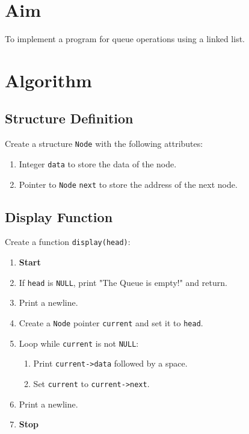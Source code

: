 
\section{Aim}
To implement a program for queue operations using a linked list.

\section{Algorithm}
 {\selectfont

  \subsection{Structure Definition}
  Create a structure \texttt{Node} with the following attributes:
  \begin{enumerate}[label=\arabic*:,left=0pt]
    \item Integer \texttt{data} to store the data of the node.
    \item Pointer to \texttt{Node} \texttt{next} to store the address of the next node.
  \end{enumerate}

  \subsection{Display Function}
  Create a function \texttt{display(head)}:
  \begin{enumerate}[label=\arabic*:,left=0pt]
    \item \textbf{Start}
    \item If \texttt{head} is \texttt{NULL}, print "The Queue is empty!" and return.
    \item Print a newline.
    \item Create a \texttt{Node} pointer \texttt{current} and set it to \texttt{head}.
    \item Loop while \texttt{current} is not \texttt{NULL}:
          \begin{enumerate}[label=2.\arabic*:, start=1]
            \item Print \texttt{current->data} followed by a space.
            \item Set \texttt{current} to \texttt{current->next}.
          \end{enumerate}
    \item Print a newline.
    \item \textbf{Stop}
  \end{enumerate}

}
